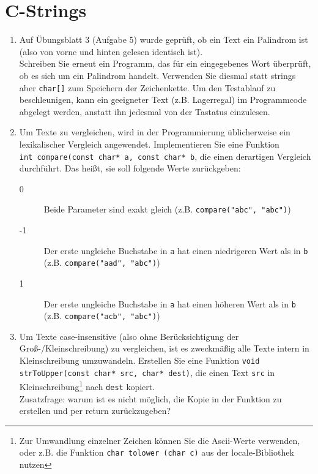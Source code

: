 \documentclass[paper=a4, fontsize=11pt, twoside]{scrartcl}
\begin{document}
\section*{C-Strings}
\begin{enumerate}[resume]
  \item Auf Übungsblatt 3 (Aufgabe 5) wurde geprüft, ob ein Text ein Palindrom ist (also von vorne und hinten gelesen identisch ist). \\
Schreiben Sie erneut ein Programm, das für ein eingegebenes Wort überprüft, ob es sich um ein Palindrom handelt. Verwenden Sie diesmal statt strings aber \texttt{char[]} zum Speichern der Zeichenkette. Um den Testablauf zu beschleunigen, kann ein geeigneter Text (z.B. \glqq Lagerregal\grqq) im Programmcode abgelegt werden, anstatt ihn jedesmal von der Tastatus einzulesen. 
  \item Um Texte zu vergleichen, wird in der Programmierung üblicherweise ein lexikalischer Vergleich angewendet. Implementieren Sie eine Funktion \\\texttt{int compare(const char* a, const char* b}, die einen derartigen Vergleich durchführt. Das heißt, sie soll folgende Werte zurückgeben:
    \begin{description}
      \item[0] Beide Parameter sind exakt gleich (z.B. \texttt{compare("abc", "abc")})
      \item[-1] Der erste ungleiche Buchstabe in \texttt{a} hat einen niedrigeren Wert als in \texttt{b} (z.B. \texttt{compare("aad", "abc")})
      \item[1] Der erste ungleiche Buchstabe in \texttt{a} hat einen höheren Wert als in \texttt{b} (z.B. \texttt{compare("acb", "abc")})
    \end{description}
  \item Um Texte case-insensitive (also ohne Berücksichtigung der Groß-/Kleinschreibung) zu vergleichen, ist es zweckmäßig alle Texte intern in Kleinschreibung umzuwandeln. Erstellen Sie eine Funktion \texttt{void strToUpper(const char* src, char* dest)}, die einen Text \texttt{src} in Kleinschreibung\footnote{Zur Umwandlung einzelner Zeichen können Sie die Ascii-Werte verwenden, oder z.B. die Funktion \texttt{char tolower (char c)} aus der locale-Bibliothek nutzen} nach \texttt{dest} kopiert.\\
  Zusatzfrage: warum ist es nicht möglich, die Kopie in der Funktion zu erstellen und per return zurückzugeben?

\end{enumerate}
\end{document}
